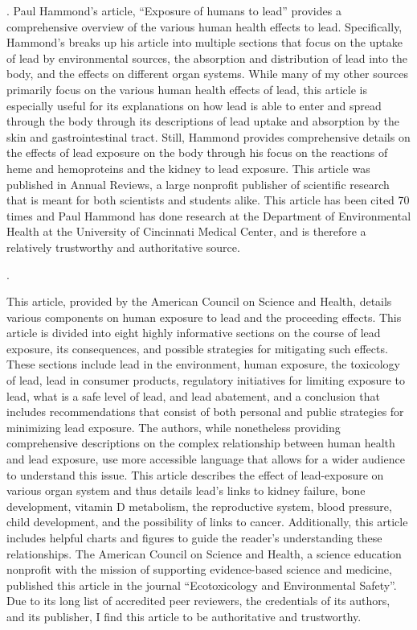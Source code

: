 \documentclass{article}
\begin{document}
. 
\bigskip
Paul Hammond’s article, “Exposure of humans to lead” provides a comprehensive overview of the various human health effects to lead. Specifically, Hammond’s breaks up his article into multiple sections that focus on the uptake of lead by environmental sources, the absorption and distribution of lead into the body, and the effects on different organ systems.  While many of my other sources primarily focus on the various human health effects of lead, this article is especially useful for its explanations on how lead is able to enter and spread through the body through its descriptions of lead uptake and absorption by the skin and gastrointestinal tract. Still, Hammond provides comprehensive details on the effects of lead exposure on the body through his focus on the reactions of heme and hemoproteins and the kidney to lead exposure.  This article was published in Annual Reviews, a large nonprofit publisher of scientific research that is meant for both scientists and students alike. This article has been cited 70 times and Paul Hammond has done research at the Department of Environmental Health at the University of Cincinnati Medical Center, and is therefore a relatively trustworthy and authoritative source.

\bigskip
{}. 

\bigskip
This article, provided by the American Council on Science and Health, details various components on human exposure to lead and the proceeding effects. This article is divided into eight highly informative sections on the course of lead exposure, its consequences, and possible strategies for mitigating such effects. These sections include lead in the environment, human exposure, the toxicology of lead, lead in consumer products, regulatory initiatives for limiting exposure to lead, what is a safe level of lead, and lead abatement, and a conclusion that includes recommendations that consist of both personal and public strategies for minimizing lead exposure.  The authors, while nonetheless providing comprehensive descriptions on the complex relationship between human health and lead exposure, use more accessible language that allows for a wider audience to understand this issue. This article describes the effect of lead-exposure on various organ system and thus details lead’s links to kidney failure, bone development, vitamin D metabolism, the reproductive system, blood pressure, child development, and the possibility of links to cancer.  Additionally, this article includes helpful charts and figures to guide the reader’s understanding these relationships. The American Council on Science and Health, a science education nonprofit with the mission of supporting evidence-based science and medicine, published this article in the journal “Ecotoxicology and Environmental Safety”. Due to its long list of accredited peer reviewers, the credentials of its authors, and its publisher, I find this article to be authoritative and trustworthy. 
\bigskip
\end{document}
